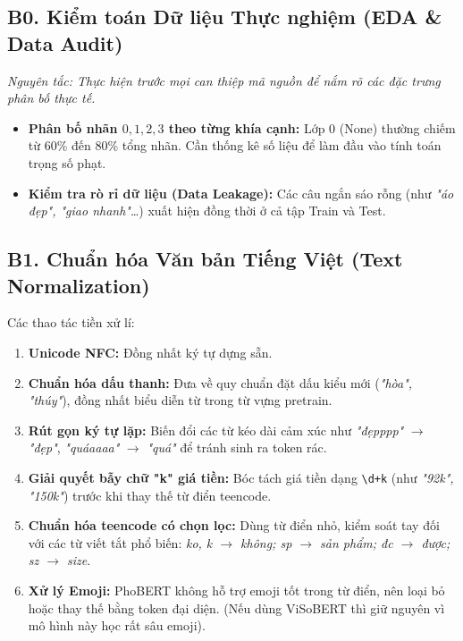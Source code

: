 \documentclass[11pt,a4paper]{article}
\begin{document}
\subsection*{B0. Kiểm toán Dữ liệu Thực nghiệm (EDA \& Data Audit)}
\textit{Nguyên tắc: Thực hiện trước mọi can thiệp mã nguồn để nắm rõ các đặc trưng phân bố thực tế.}
\begin{itemize}
    \item \textbf{Phân bố nhãn $0, 1, 2, 3$ theo từng khía cạnh:} Lớp 0 (None) thường chiếm từ 60\% đến 80\% tổng nhãn. Cần thống kê số liệu để làm đầu vào tính toán trọng số phạt.
    \item \textbf{Kiểm tra rò rỉ dữ liệu (Data Leakage):} Các câu ngắn sáo rỗng (như \textit{"áo đẹp", "giao nhanh"}\dots) xuất hiện đồng thời ở cả tập Train và Test.
\end{itemize}

\subsection*{B1. Chuẩn hóa Văn bản Tiếng Việt (Text Normalization)}
Các thao tác tiền xử lí:
\begin{enumerate}
    \item \textbf{Unicode NFC:} Đồng nhất ký tự dựng sẵn.
    \item \textbf{Chuẩn hóa dấu thanh:} Đưa về quy chuẩn đặt dấu kiểu mới (\textit{"hòa", "thúy"}), đồng nhất biểu diễn từ trong từ vựng pretrain.
    \item \textbf{Rút gọn ký tự lặp:} Biến đổi các từ kéo dài cảm xúc như \textit{"đẹpppp"} $\rightarrow$ \textit{"đẹp"}, \textit{"quáaaaa"} $\rightarrow$ \textit{"quá"} để tránh sinh ra token rác.
    \item \textbf{Giải quyết bẫy chữ "k" giá tiền:} Bóc tách giá tiền dạng \texttt{\textbackslash d+k} (như \textit{"92k", "150k"}) trước khi thay thế từ điển teencode.
    \item \textbf{Chuẩn hóa teencode có chọn lọc:} Dùng từ điển nhỏ, kiểm soát tay đối với các từ viết tắt phổ biến: \textit{ko, k $\rightarrow$ không; sp $\rightarrow$ sản phẩm; đc $\rightarrow$ được; sz $\rightarrow$ size}.
    \item \textbf{Xử lý Emoji:} PhoBERT không hỗ trợ emoji tốt trong từ điển, nên loại bỏ hoặc thay thế bằng token đại diện. (Nếu dùng ViSoBERT thì giữ nguyên vì mô hình này học rất sâu emoji).
\end{enumerate}
\end{document}
